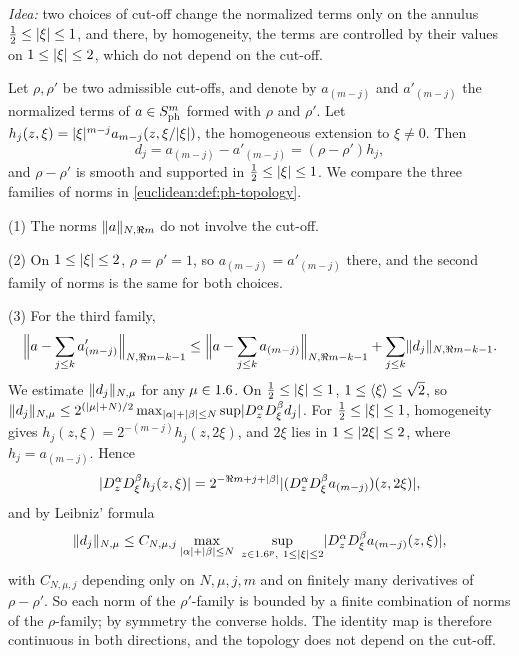 \subsection*{}

\emph{Idea:} two choices of cut-off change the normalized terms only on the annulus
$\frac12\le\lvert \xi\rvert\le1$, and there, by homogeneity, the terms are controlled by their
values on $1\le\lvert \xi\rvert\le2$, which do not depend on the cut-off.

Let $\rho,\rho'$ be two admissible cut-offs, and denote by $a_{(m-j)}$ and $a'_{(m-j)}$ the
normalized terms of $a\in S^{m}_{\mathrm{ph}}$ formed with $\rho$ and $\rho'$. Let
$h_j(z,\xi)=\lvert \xi\rvert^{m-j}a_{m-j}(z,\xi/\lvert \xi\rvert)$, the homogeneous extension to
$\xi\ne0$. Then
\begin{equation*}
  d_j=a_{(m-j)}-a'_{(m-j)}=(\rho-\rho')h_j,
\end{equation*}
and $\rho-\rho'$ is smooth and supported in $\frac12\le\lvert \xi\rvert\le1$. We compare the three
families of norms in \cref{euclidean:def:ph-topology}.

(1) The norms $\lVert a\rVert_{N,\Re m}$ do not involve the cut-off.

(2) On $1\le\lvert \xi\rvert\le2$, $\rho=\rho'=1$, so $a_{(m-j)}=a'_{(m-j)}$ there, and the second
family of norms is the same for both choices.

(3) For the third family,
\begin{equation*}
  \Bigl\|a-\sum_{j\le k}a'_{(m-j)}\Bigr\|_{N,\Re m-k-1}\le
  \Bigl\|a-\sum_{j\le k}a_{(m-j)}\Bigr\|_{N,\Re m-k-1}+\sum_{j\le k}\lVert d_j\rVert_{N,\Re m-k-1}.
\end{equation*}
We estimate $\lVert d_j\rVert_{N,\mu}$ for any $\mu\in1.6$. On
$\frac12\le\lvert \xi\rvert\le1$, $1\le\langle \xi\rangle\le\sqrt2$, so
$\lVert d_j\rVert_{N,\mu}\le2^{(\lvert \mu\rvert+N)/2}\max_{\lvert \alpha\rvert+\lvert \beta\rvert\le N}\sup\lvert D^\alpha_zD^\beta_\xi d_j\rvert$.
For $\frac12\le\lvert \xi\rvert\le1$, homogeneity gives $h_j(z,\xi)=2^{-(m-j)}h_j(z,2\xi)$, and
$2\xi$ lies in $1\le\lvert 2\xi\rvert\le2$, where $h_j=a_{(m-j)}$. Hence
\begin{equation*}
  \lvert D^\alpha_zD^\beta_\xi h_j(z,\xi)\rvert=2^{-\Re m+j+\lvert \beta\rvert}
  \lvert (D^\alpha_zD^\beta_\xi a_{(m-j)})(z,2\xi)\rvert,
\end{equation*}
and by Leibniz' formula
\begin{equation*}
  \lVert d_j\rVert_{N,\mu}\le C_{N,\mu,j}\max_{\lvert \alpha\rvert+\lvert \beta\rvert\le N}\
  \sup_{z\in1.6^p,\ 1\le\lvert \xi\rvert\le2}\lvert D^\alpha_zD^\beta_\xi a_{(m-j)}(z,\xi)\rvert,
\end{equation*}
with $C_{N,\mu,j}$ depending only on $N,\mu,j,m$ and on finitely many derivatives of
$\rho-\rho'$. So each norm of the $\rho'$-family is bounded by a finite combination of
norms of the $\rho$-family; by symmetry the converse holds. The identity map is therefore
continuous in both directions, and the topology does not depend on the cut-off.


